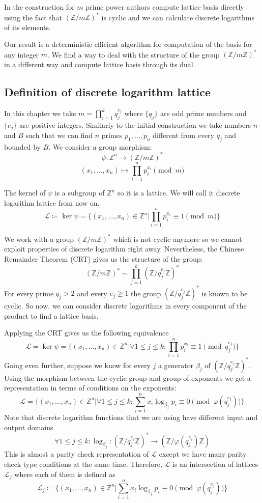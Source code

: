 \documentclass[12pt]{article}
\newcommand{\ZZ}{\mathbb{Z}}
\newcommand{\LL}{\mathcal{L}}
\begin{document}
In the construction for $m$ prime power authors compute lattice basis directly using the fact that $(\ZZ/m\ZZ)^*$ is cyclic and we can calculate discrete logarithms of its elements.

Our result is a deterministic efficient algorithm for computation of the basis for any integer $m$. We find a way to deal with the structure of the group $(\ZZ/m\ZZ)^*$ in a different way and compute lattice basis through its dual.


\subsection{Definition of discrete logarithm lattice }
\label{subsec:def_integers}


In this chapter we take $m = \prod_{i=1}^{k} q_{j}^{e_{j}}$ where $\{q_{j}\}$ are odd prime numbers and $\{e_{j}\}$ are positive integers. Similarly to the initial construction we take numbers $n$ and $B$ such that we can find $n$ primes $p_{1}, \dots , p_{n}$ different from every $q_{j}$ and bounded by $B$. We consider a group morphism:
\[
    \psi : \ZZ^{n} \rightarrow (\ZZ/m\ZZ)^*
\]
\[
    (x_{1}, \dots, x_{n}) \mapsto \prod_{i=1}^{n}p_{i}^{x_{i}} \pmod{m}
\]


The kernel of $\psi$ is a subgroup of $\ZZ^{n}$ so it is a lattice. We will call it discrete logarithm lattice from now on.
\[
    \LL \coloneqq \ker \psi = \{(x_{1}, \dots, x_{n}) \in \ZZ^{n} | \prod_{i=1}^{n}p_{i}^{x_{i}} \equiv 1 \pmod{m}\}
\]

We work with a group $(\ZZ/m\ZZ)^*$ which is not cyclic anymore so we cannot exploit properties of discrete logarithm right away. Nevertheless, the Chinese Remainder Theorem (CRT) gives us the structure of the group:
\[
   (\ZZ/m\ZZ)^* \sim \prod_{j=1}^{k}(\ZZ/q_{j}^{e_{j}}\ZZ)^*
\]
For every prime $q_{j} > 2$ and every $e_{j} \geq 1$ the group $(\ZZ/q_{j}^{e_{j}}\ZZ)^*$ is known to be cyclic. So now, we can consider discrete logarithms in every component of the product to find a lattice basis.

Applying the CRT gives us the following equivalence
\[
    \LL = \ker \psi = \{(x_{1}, \dots, x_{n}) \in \ZZ^{n} |  \forall 1 \leq j \leq k: \prod_{i=1}^{n}p_{i}^{x_{i}} \equiv 1 \pmod{q_{j}^{e_{j}}}\}
\]
Going even further, suppose we know for every $j$ a generator ${\beta_{j}}$ of  $(\ZZ/q_{j}^{e_{j}}\ZZ)^*$. Using the morphism between the cyclic group and group of exponents we get a representation in terms of conditions on the exponents:
\[
    \LL = \{(x_{1}, \dots, x_{n}) \in \ZZ^{n} |  \forall 1 \leq j \leq k: \sum_{i=1}^{n}x_{i}\log_{\beta_{j}}p_{i}\equiv 0 \pmod{\varphi(q_{j}^{e_{j}})}\}
\]
Note that discrete logarithm functions that we are using have different input and output domains
\[
    \forall 1 \leq j \leq k: \log_{\beta_{j}}: (\ZZ/q_{j}^{e_{j}}\ZZ)^* \rightarrow (\ZZ/\varphi(q_{j}^{e_{j}})\ZZ)
\]
This is almost a parity check representation of $\LL$ except we have many parity check type conditions at the same time. Therefore, $\LL$ is an intersection of lattices $\LL_{j}$ where each of them is defined as
\[
\label{parity check}
    \LL_{j} \coloneqq \{(x_{1}, \dots, x_{n}) \in \ZZ^{n} | \sum_{i=1}^{n}x_{i}\log_{\beta_{j}}p_{i}\equiv 0 \pmod{\varphi(q_{j}^{e_{j}})}\}
\]
\end{document}
